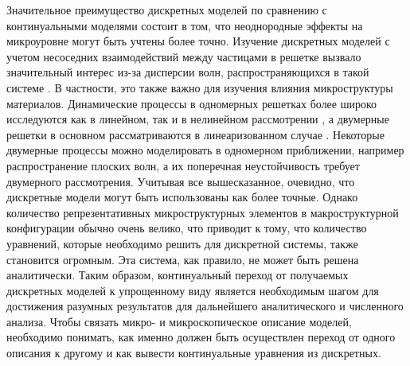 Значительное преимущество дискретных моделей по сравнению с континуальными моделями состоит в том, что неоднородные эффекты на микроуровне могут быть учтены более точно. Изучение дискретных моделей с учетом несоседних взаимодействий между частицами в решетке вызвало значительный интерес из-за дисперсии волн, распространяющихся в такой системе \cite{AskMetr, Maug, Manev, bound_andr, Kosev, Mich, erem}. В частности, это также важно для изучения влияния микроструктуры материалов. Динамические процессы в одномерных решетках более широко исследуются как в линейном, так и в нелинейном рассмотрении \cite{Ostoja, Maug}, а двумерные решетки в основном рассматриваются в линеаризованном случае \cite{AskMetr, Ostoja, Tov}. Некоторые двумерные процессы можно моделировать в одномерном приближении, например распространение плоских волн, а их поперечная неустойчивость требует двумерного рассмотрения. 
Учитывая все вышесказанное, очевидно, что дискретные модели могут быть использованы как более точные. Однако количество репрезентативных микроструктурных элементов в макроструктурной конфигурации обычно очень велико, что приводит к тому, что количество уравнений, которые необходимо решить для дискретной системы, также становится огромным. Эта система, как правило, не может быть решена аналитически. Таким образом, континуальный переход от получаемых дискретных моделей к упрощенному виду является необходимым шагом для достижения разумных результатов для дальнейшего аналитического и численного анализа.
Чтобы связать микро- и микроскопическое описание моделей, необходимо понимать, как именно должен быть осуществлен переход от одного описания к другому и как вывести континуальные уравнения из дискретных.
